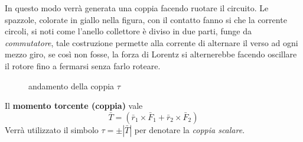 \documentclass[10pt, letterpaper]{report}
\begin{document}
In questo modo verrà generata una coppia facendo ruotare il circuito. Le spazzole, colorate in giallo nella figura, con il contatto fanno si che la corrente circoli, si noti come l'anello collettore 
è diviso in due parti, funge da \textit{commutatore}, tale costruzione permette alla corrente di alternare il verso ad ogni mezzo giro, se così non fosse, la forza di Lorentz si alternerebbe facendo oscillare il rotore fino a fermarsi senza farlo roteare.
\begin{center}
    \begin{figure}[h!]
       \centering
           \caption{andamento della coppia $\tau$}
   \end{figure}
   \end{center}
Il \textbf{momento torcente (coppia)} vale 
$$ \bar T = (\bar r_1 \times  \bar F_1 + \bar r_2 \times  \bar F_2)$$
Verrà utilizzato il simbolo $\tau = \pm|\bar T|$ per denotare la \textit{coppia scalare}.
\end{document}
